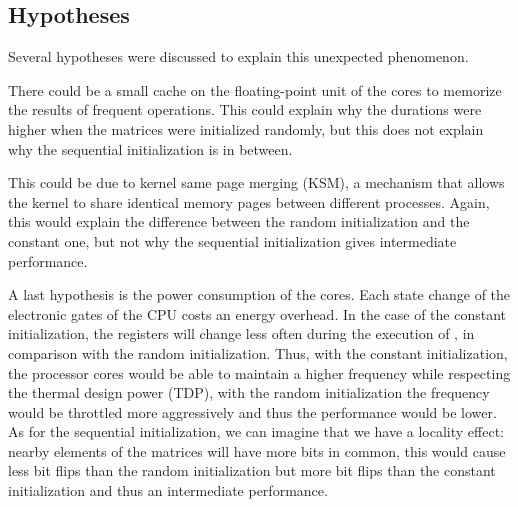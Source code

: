         \subsection{Hypotheses}
            Several hypotheses were discussed to explain this unexpected phenomenon.

            There could be a small cache  on the floating-point unit of the cores to memorize the results of frequent
            operations. This could explain why the durations were higher when the matrices were initialized randomly,
            but this does not explain why the sequential initialization is in between.

            This could be due to kernel same page merging (KSM), a mechanism that allows the kernel to share identical
            memory pages between different processes. Again, this would explain the difference between the random
            initialization and the constant one, but not why the sequential initialization gives intermediate
            performance.

            A last hypothesis is the power consumption of the cores. Each state change of the electronic gates of the
            CPU costs an energy overhead. In the case of the constant initialization, the registers will change less
            often during the execution of \dgemm, in comparison with the random initialization. Thus, with the
            constant initialization, the processor cores would be able to maintain a higher frequency while respecting
            the thermal design power (TDP), with the random initialization the frequency would be throttled more
            aggressively and thus the performance would be lower.
            As for the sequential initialization, we can imagine that we have a locality effect: nearby elements of the
            matrices will have more bits in common, this would cause less bit flips than the random initialization but
            more bit flips than the constant initialization and thus an intermediate performance.

